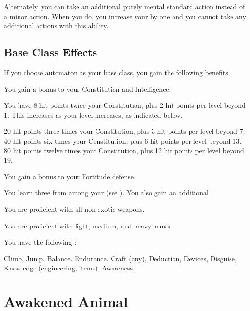       Alternately, you can take an additional purely mental standard action instead of a minor action.
      When you do, you increase your  by one and you  cannot take any additional actions with this ability.

  \subsection{Base Class Effects}
    If you choose automaton as your base class, you gain the following benefits.

     You gain a  bonus to your Constitution and Intelligence.

      You have 8 hit points \add twice your Constitution, plus 2 hit points per level beyond 1.
      This increases as your level increases, as indicated below.
      \begin{itemize}
         20 hit points \add three times your Constitution, plus 3 hit points per level beyond 7.
         40 hit points \add six times your Constitution, plus 6 hit points per level beyond 13.
         80 hit points \add twelve times your Constitution, plus 12 hit points per level beyond 19.
      \end{itemize}

      You gain a  bonus to your Fortitude defense.

      You learn three  from among your  (see ). You also gain an additional .

      You are proficient with all non-exotic weapons.

      You are proficient with light, medium, and heavy armor.

      You have the following :
      \begin{itemize}
         Climb, Jump.
         Balance.
         Endurance.
         Craft (any), Deduction, Devices, Disguise, Knowledge (engineering, items).
         Awareness.
      \end{itemize}

\section{Awakened Animal}

